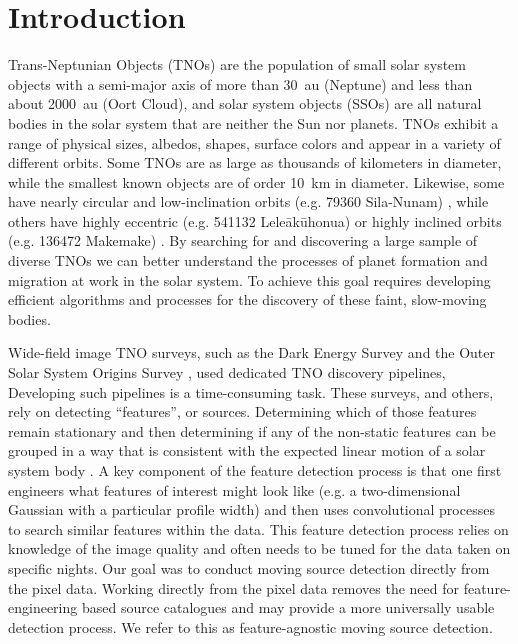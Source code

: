 \section{Introduction} \label{sec:intro}
Trans-Neptunian Objects (TNOs) are the population of small solar system objects with a semi-major axis of more than 30~au (Neptune) and less than about 2000~au (Oort Cloud), and solar system objects (SSOs) are all natural bodies in the solar system that are neither the Sun nor planets.
TNOs exhibit a range of physical sizes, albedos, shapes, surface colors and appear in a variety of different orbits.
Some TNOs are as large as thousands of kilometers in diameter, while the smallest known objects are of order 10~km in diameter.
Likewise, some have nearly circular and low-inclination orbits (e.g. 79360 Sila-Nunam) \citep{1997MPEC....N...08L}, while others have highly eccentric (e.g. 541132 Leleākūhonua) \citep{2019AJ....157..139S} or highly inclined orbits (e.g. 136472 Makemake) \citep{2005IAUC.8577....1B}.
By searching for and discovering a large sample of diverse TNOs we can better understand the processes of planet formation and migration at work in the solar system.  
To achieve this goal requires developing efficient algorithms and processes for the discovery of these faint, slow-moving bodies.

Wide-field image TNO surveys, such as the Dark Energy Survey \citep{2020ApJS..247...32B} and the Outer Solar System Origins Survey \citep{2016AJ....152...70B}, used dedicated TNO discovery pipelines, Developing such pipelines is a time-consuming task.
These surveys, and others, rely on detecting ``features'', or sources. 
Determining which of those features remain stationary and then determining if any of the non-static features can be grouped in a way that is consistent with the expected linear motion of a solar system body \citep[see][for a complete description of such a detection system]{2004MNRAS.347..471P}.
A key component of the feature detection process is that one first engineers what features of interest might look like (e.g. a two-dimensional Gaussian with a particular profile width) and then uses convolutional processes to search similar features within the data.
This feature detection process relies on knowledge of the image quality and often needs to be tuned for the data taken on specific nights.
Our goal was to conduct moving source detection directly from the pixel data.
Working directly from the pixel data removes the need for feature-engineering based source catalogues \citep[section 3]{2016AJ....151..158F} and may provide a more universally usable detection process.
We refer to this as feature-agnostic moving source detection.

